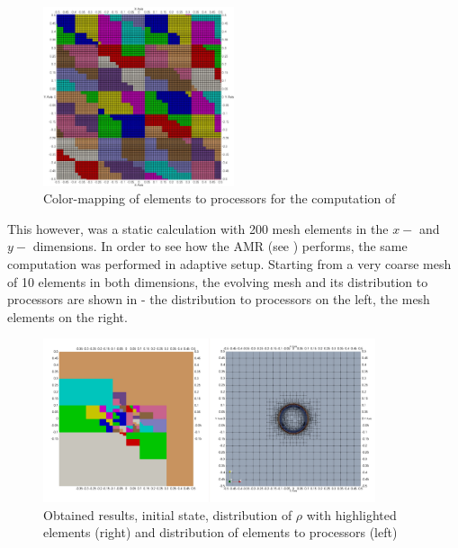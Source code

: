 \begin{figure}[H]
	\begin{center}
		\includegraphics[width=0.5\textwidth]{img/mhd-blast/old/subdomain.jpg}
	\caption{Color-mapping of elements to processors for the computation of }
	\label{figure:subdomainsBlastOld}
	\end{center}
\end{figure}
\vspace{-5mm}

This however, was a static calculation with 200 mesh elements in the $x-$ and $y-$ dimensions. In order to see how the AMR (see ) performs, the same computation was performed in adaptive setup. Starting from a very coarse mesh of 10 elements in both dimensions, the evolving mesh and its distribution to processors are shown in  - the distribution to processors on the left, the mesh elements on the right.

\begin{figure}[H]
	\begin{center}
		\includegraphics[width=0.87\textwidth]{img/mhd-blast/old/mya1.jpg}
	\caption{Obtained results, initial state, distribution of $\rho$ with highlighted elements (right) and distribution of elements to processors (left)}
	\label{figure:blastOldMyAdapt1}
	\end{center}
\end{figure}
\vspace{-8mm}


